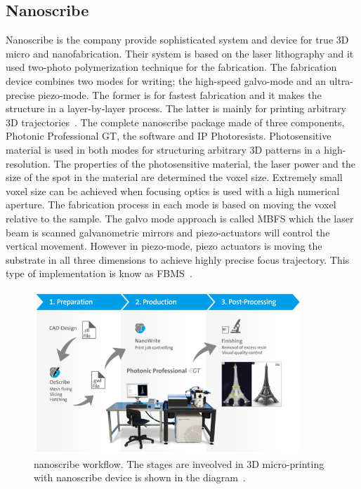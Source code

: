 \documentclass[12pt,a4paper,titlepage]{report}
\begin{document}

\subsection{Nanoscribe}\label{nanoscribe}

Nanoscribe is the company provide sophisticated system and device for true 3D
 micro and nanofabrication. Their system is based on the laser lithography and it 
used two-photo polymerization technique for the fabrication. The fabrication device combines 
two modes for writing; the high-speed galvo-mode and an ultra-precise piezo-mode. The former 
is for fastest fabrication and it makes the structure in a layer-by-layer process. The latter is mainly for
 printing arbitrary 3D trajectories~\citep{Doe:2014Feb:Online}. The complete nanoscribe 
package made of three components, Photonic Professional GT, the software and IP Photoresists. 
Photosensitive material is used in both modes for structuring arbitrary 3D patterns in a high-resolution. 
The properties of the photosensitive material, the laser power and the size of the spot in the material are
 determined the voxel size. Extremely small voxel size can be achieved when focusing optics is used with 
a high numerical aperture. The fabrication process in each mode is based on moving the voxel relative to
 the sample. The galvo mode approach is called \ac*{MBFS} which the laser beam is scanned 
galvanometric mirrors and piezo-actuators will control the vertical movement. However in 
piezo-mode, piezo actuators is moving the substrate in all three dimensions to achieve highly 
precise focus trajectory. This type of implementation is know as \ac*{FBMS}~\citep{Doe:2014Feb:Online}.




\begin{figure}
  \centering
    \includegraphics[width=0.9\textwidth]{nanoscribeWorkflow}
  \caption[Nanoscribe workflow]{nanoscribe workflow. The stages are inveolved in  3D micro-printing with nanoscribe
 device is shown in the diagram~\citep{Doe:2014Feb:Online}.}
  \label{nanoscribeWorkflow}
\end{figure}
\end{document}
